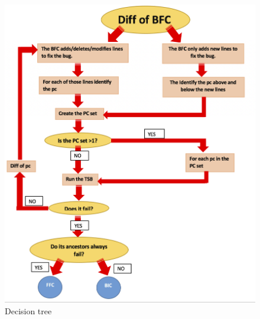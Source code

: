 \documentclass[a4paper, 12pt]{book}
\begin{document}
\begin{figure}[ht]
\centering
\includegraphics[width=\columnwidth]{img/algoritmo.png}
\caption{Decision tree }
\label{fig:algoritmo}       %
\end{figure}


\end{document}
